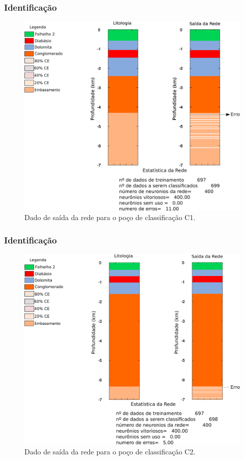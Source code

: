 \documentclass[10pt]{beamer} %
\begin{document}
\begin{frame}
	\frametitle{Identificação}
\begin{figure}[H]
	\centering
		\includegraphics[scale=0.45]{Imagens/IDC1.png}
	\caption{Dado de saída da rede para o poço de classificação C1.}
	\label{Class C1}
\end{figure} 
\end{frame}

\begin{frame}
	\frametitle{Identificação}
	\begin{figure}[H]
		\centering
			\includegraphics[scale=0.45]{Imagens/IDC2.png}
		\caption{Dado de saída da rede para o poço de classificação C2.}
		\label{Class C2}
	\end{figure} 
\end{frame}
	
\end{document}
